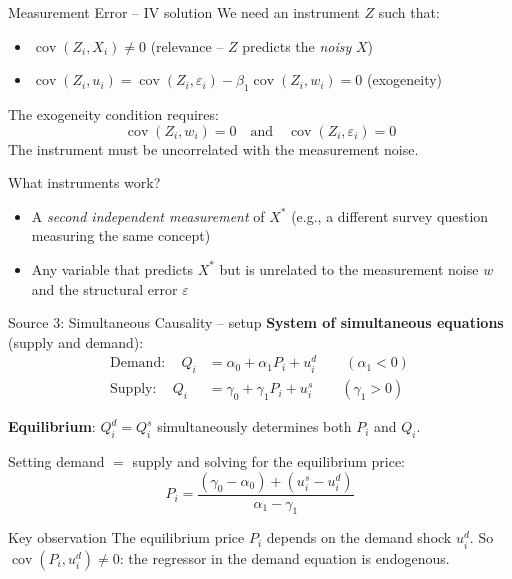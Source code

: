 \documentclass[10pt]{beamer}
\begin{document}
\begin{frame}{Measurement Error -- IV solution}
\label{slide:meas_err_iv}
We need an instrument $Z$ such that:
\begin{itemize}
  \item $\operatorname{cov}(Z_i, X_i) \neq 0$ \quad (relevance -- $Z$ predicts the \emph{noisy} $X$)
  \item $\operatorname{cov}(Z_i, u_i) = \operatorname{cov}(Z_i, \varepsilon_i) - \beta_1 \operatorname{cov}(Z_i, w_i) = 0$ \quad (exogeneity)
\end{itemize}

\pause
The exogeneity condition requires:
\[
\operatorname{cov}(Z_i, w_i) = 0 \quad \text{and} \quad \operatorname{cov}(Z_i, \varepsilon_i) = 0
\]
The instrument must be uncorrelated with the \alert{measurement noise}.

\pause
\vspace{0.5em}
\begin{exampleblock}{What instruments work?}
\begin{itemize}
  \item A \emph{second independent measurement} of $X^*$ (e.g., a different survey question measuring the same concept)
  \item Any variable that predicts $X^*$ but is unrelated to the measurement noise $w$ and the structural error $\varepsilon$
\end{itemize}
\end{exampleblock}
\end{frame}

\begin{frame}{Source 3: Simultaneous Causality -- setup}
\label{slide:simul_setup}
\textbf{System of simultaneous equations} (supply and demand):
\begin{align*}
\text{Demand}: \quad Q_i &= \alpha_0 + \alpha_1 P_i + u_i^d \qquad (\alpha_1 < 0) \\
\text{Supply}: \quad Q_i &= \gamma_0 + \gamma_1 P_i + u_i^s \qquad (\gamma_1 > 0)
\end{align*}

\textbf{Equilibrium}: $Q_i^d = Q_i^s$ simultaneously determines both $P_i$ and $Q_i$.

\pause
\vspace{0.5em}
Setting demand $=$ supply and solving for the equilibrium price:
\[
P_i = \frac{(\gamma_0 - \alpha_0) + (u_i^s - u_i^d)}{\alpha_1 - \gamma_1}
\]

\pause
\begin{alertblock}{Key observation}
The equilibrium price $P_i$ depends on the demand shock $u_i^d$. So $\operatorname{cov}(P_i, u_i^d) \neq 0$: the regressor in the demand equation is \alert{endogenous}.
\end{alertblock}
\end{frame}
\end{document}
